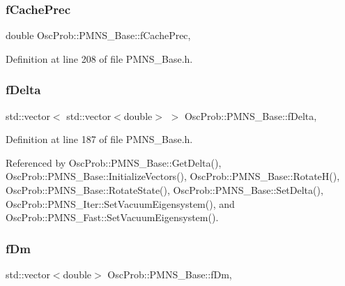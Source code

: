 \subsubsection{\texorpdfstring{f\+Cache\+Prec}{fCachePrec}}
{\footnotesize\ttfamily double Osc\+Prob\+::\+P\+M\+N\+S\+\_\+\+Base\+::f\+Cache\+Prec\hspace{0.3cm}{\ttfamily [protected]}, {\ttfamily [inherited]}}



Definition at line 208 of file P\+M\+N\+S\+\_\+\+Base.\+h.

\mbox{\label{classOscProb_1_1PMNS__Base_ab2a5fa40e689b221c8a7d2c17213810d}} 
\subsubsection{\texorpdfstring{f\+Delta}{fDelta}}
{\footnotesize\ttfamily std\+::vector$<$ std\+::vector$<$double$>$ $>$ Osc\+Prob\+::\+P\+M\+N\+S\+\_\+\+Base\+::f\+Delta\hspace{0.3cm}{\ttfamily [protected]}, {\ttfamily [inherited]}}



Definition at line 187 of file P\+M\+N\+S\+\_\+\+Base.\+h.



Referenced by Osc\+Prob\+::\+P\+M\+N\+S\+\_\+\+Base\+::\+Get\+Delta(), Osc\+Prob\+::\+P\+M\+N\+S\+\_\+\+Base\+::\+Initialize\+Vectors(), Osc\+Prob\+::\+P\+M\+N\+S\+\_\+\+Base\+::\+Rotate\+H(), Osc\+Prob\+::\+P\+M\+N\+S\+\_\+\+Base\+::\+Rotate\+State(), Osc\+Prob\+::\+P\+M\+N\+S\+\_\+\+Base\+::\+Set\+Delta(), Osc\+Prob\+::\+P\+M\+N\+S\+\_\+\+Iter\+::\+Set\+Vacuum\+Eigensystem(), and Osc\+Prob\+::\+P\+M\+N\+S\+\_\+\+Fast\+::\+Set\+Vacuum\+Eigensystem().

\mbox{\label{classOscProb_1_1PMNS__Base_a406a31c3b5d620e5a0cace5b411f9f70}} 
\subsubsection{\texorpdfstring{f\+Dm}{fDm}}
{\footnotesize\ttfamily std\+::vector$<$double$>$ Osc\+Prob\+::\+P\+M\+N\+S\+\_\+\+Base\+::f\+Dm\hspace{0.3cm}{\ttfamily [protected]}, {\ttfamily [inherited]}}



